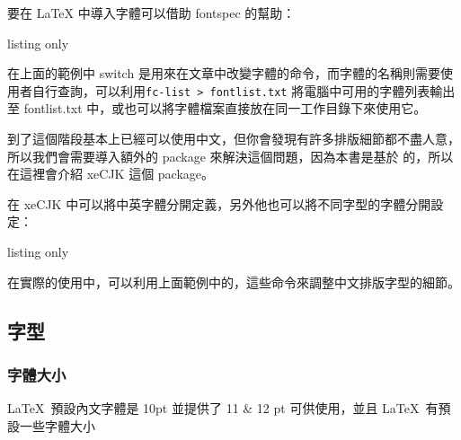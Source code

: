 要在 LaTeX 中導入字體可以借助 fontspec 的幫助：

\begin{tcblisting}{listing only}
\end{tcblisting}

在上面的範例中 switch 是用來在文章中改變字體的命令，而字體的名稱則需要使用者自行查詢，可以利用\verb|fc-list > fontlist.txt| 將電腦中可用的字體列表輸出至 fontlist.txt 中，或也可以將字體檔案直接放在同一工作目錄下來使用它。

到了這個階段基本上已經可以使用中文，但你會發現有許多排版細節都不盡人意，所以我們會需要導入額外的 package 來解決這個問題，因為本書是基於 \XeLaTeX 的，所以在這裡會介紹 xeCJK 這個 package。

在 xeCJK 中可以將中英字體分開定義，另外他也可以將不同字型的字體分開設定：

\begin{tcblisting}{listing only}
\usepackage{xeCJK}
\newCJKfontfamily{}%
\end{tcblisting}

在實際的使用中，可以利用上面範例中的，這些命令來調整中文排版字型的細節。
\subsection{字型}

\subsubsection{字體大小}

\LaTeX\ 預設內文字體是 10pt 並提供了 11 \& 12 pt 可供使用，並且 \LaTeX\ 有預設一些字體大小

